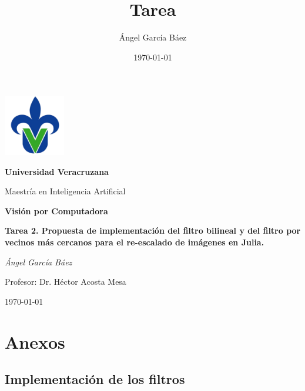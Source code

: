 \documentclass[11pt, letterpaper]{article}
\title{\bfseries Tarea}
\author{Ángel García Báez}
\date{\today}
\begin{document}
	
	\begin{titlepage}
		\centering
		\includegraphics[width=0.2\textwidth]{logo.png}\par
		\vspace{1cm}
		{\LARGE \bfseries Universidad Veracruzana \par}
		\vspace{1cm}
		{\Large Maestría en Inteligencia Artificial\par}
		\vspace{3cm}
		{\LARGE \bfseries Visión por Computadora \par}
		\vspace{1cm}
		{\Large \bfseries Tarea 2. Propuesta de implementación del filtro bilineal y del filtro por vecinos más cercanos para el re-escalado de imágenes en Julia. \par}
		\vfill
		{\Large \textit{Ángel García Báez}\par}
		\vspace{1cm}
		{\Large Profesor: Dr. Héctor Acosta Mesa\par}
		\vfill
		{\Large \today \par}
	\end{titlepage}
	
	\newpage
	\tableofcontents
	\newpage
	
	\cite{gonzalez2018digital}
		
		
		
	\section{Anexos}
	
	
	
	\subsection{Implementación de los filtros}
	
\end{document}
